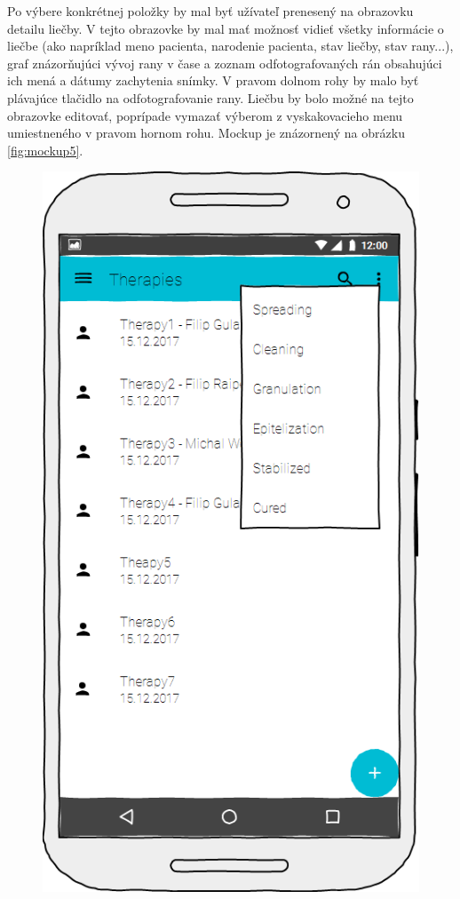 Po výbere konkrétnej položky by mal byť užívateľ prenesený na obrazovku detailu liečby. V tejto obrazovke by mal mať možnosť vidieť všetky informácie o liečbe (ako napríklad meno pacienta, narodenie pacienta, stav liečby, stav rany...), graf znázorňujúci vývoj rany v čase a zoznam odfotografovaných rán obsahujúci ich mená a dátumy zachytenia snímky. V pravom dolnom rohy by malo byť plávajúce tlačidlo na odfotografovanie rany. Liečbu by bolo možné na tejto obrazovke editovať, poprípade vymazať výberom z vyskakovacieho menu umiestneného v pravom hornom rohu. Mockup je znázornený na obrázku \ref{fig:mockup5}.
\begin{figure}[h]
   \begin{minipage}{0.48\textwidth}
     \centering
     \includegraphics[scale=0.45]{fig/mockup4.png}

\end{minipage}
\end{figure}
